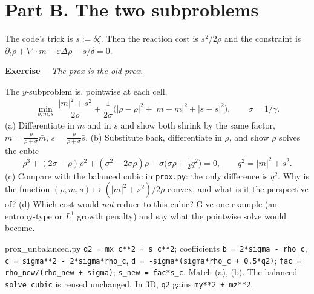 \documentclass[11pt]{article}
\newcommand{\eps}{\varepsilon}
\newcommand{\code}[1]{\texttt{#1}}
\newcommand{\dv}{\nabla\cdot}
\newcounter{ex}
\newenvironment{ex}[1]{\refstepcounter{ex}\par\medskip\noindent\textbf{Exercise \theex}\ \ \textit{#1}\par\nopagebreak\smallskip}{\par\medskip}
\begin{document}
\section*{Part B. The two subproblems}

The code's trick is $s:=\delta\zeta$. Then the reaction cost is $s^2/2\rho$ and the
constraint is $\partial_t\rho+\dv m-\eps\Delta\rho-s/\delta=0$.

\begin{ex}{The prox is the old prox.}
The $y$-subproblem is, pointwise at each cell,
\[
  \min_{\rho,m,s}\ \frac{|m|^2+s^2}{2\rho}+\frac1{2\sigma}\big(|\rho-\bar\rho|^2+|m-\bar m|^2+|s-\bar s|^2\big),
  \qquad \sigma=1/\gamma .
\]
(a) Differentiate in $m$ and in $s$ and show both shrink by the same factor,
$m=\tfrac{\rho}{\rho+\sigma}\bar m$, $s=\tfrac{\rho}{\rho+\sigma}\bar s$.
(b) Substitute back, differentiate in $\rho$, and show $\rho$ solves the cubic
\[
  \rho^3+(2\sigma-\bar\rho)\rho^2+(\sigma^2-2\sigma\bar\rho)\rho-\sigma\big(\sigma\bar\rho+\tfrac12q^2\big)=0,
  \qquad q^2=|\bar m|^2+\bar s^2 .
\]
(c) Compare with the balanced cubic in \code{prox.py}: the only difference is $q^2$. Why is
the function $(\rho,m,s)\mapsto(|m|^2+s^2)/2\rho$ convex, and what is it the perspective of?
(d) Which cost would \emph{not} reduce to this cubic? Give one example (an entropy-type or
$L^1$ growth penalty) and say what the pointwise solve would become.
\end{ex}

\begin{codebox}{prox\_unbalanced.py}
\code{q2 = mx\_c**2 + s\_c**2}; coefficients \code{b = 2*sigma - rho\_c},
\code{c = sigma**2 - 2*sigma*rho\_c}, \code{d = -sigma*(sigma*rho\_c + 0.5*q2)};
\code{fac = rho\_new/(rho\_new + sigma)}; \code{s\_new = fac*s\_c}. Match (a), (b). The
balanced \code{solve\_cubic} is reused unchanged. In 3D, \code{q2} gains \code{my**2 + mz**2}.
\end{codebox}
\end{document}
